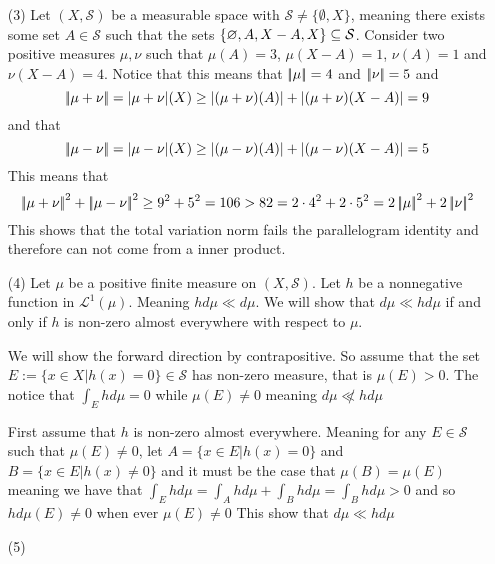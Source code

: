 \documentclass[12pt]{amsart}
\begin{document}
\begin{itemize}
\begin{enumerate}[label=(\alph*)]
    \end{enumerate}
    \item[(3)] Let $(X,\mathcal S)$ be a measurable space with 
    $\mathcal S\neq \{\emptyset, X\}$, meaning there exists some set $A\in \mathcal S$ such 
    that the sets $\{\varnothing, A, X-A, X\}\subseteq \mathcal S$. Consider two positive measures 
    $\mu,\nu$ such that $\mu(A)=3$, $\mu(X-A)=1$,  $\nu(A)=1$ and $\nu(X-A)=4$.
    Notice that this means that $\norm{\mu}=4$ and $\norm{\nu}=5$ and 
    \[\norm{\mu+\nu}=|\mu+\nu|(X)\geq |(\mu+\nu)(A)|+|(\mu+\nu)(X-A)|=9\] 
    and that
    \[\norm{\mu-\nu}=|\mu-\nu|(X)\geq |(\mu-\nu)(A)|+|(\mu-\nu)(X-A)|=5\]
    This means that 
    \[\norm{\mu+\nu}^2+\norm{\mu-\nu}^2\geq 9^2+5^2=106 > 82=2\cdot 4^2+2\cdot 5^2=2\norm{\mu}^2+2\norm{\nu}^2\]
    This shows that the total variation norm fails the parallelogram identity and therefore can not come from a inner product.


    \item[(4)] Let $\mu$ be a positive finite measure on $(X,\mathcal S)$. 
    Let $h$ be a nonnegative function in $\mathcal L^1(\mu)$. Meaning $hd\mu\ll d\mu$.
    We will show that $d\mu\ll hd\mu$ if and only if $h$ is non-zero almost everywhere with respect to $\mu$.
    
    We will show the forward direction by contrapositive. So assume that the set
    $E:=\{x\in X| h(x)=0\}\in\mathcal S$ has non-zero measure, that is $\mu(E)> 0$.
    The notice that $\int_{E}h d\mu=0$ while $\mu(E)\neq 0$ meaning $d\mu\not\ll hd\mu$

    
    First assume that $h$ is non-zero almost everywhere. Meaning for any $E\in\mathcal S$ 
    such that $\mu(E)\neq 0$, let $A=\{x\in E| h(x)=0\}$ and $B=\{x\in E| h(x)\neq 0\}$ 
    and it must be the case that $\mu(B)=\mu(E)$ meaning we
    have that $\int_E h d\mu= \int_A h d\mu+\int_B h d\mu=\int_B h d\mu>0$ and 
    so $h d\mu(E)\neq 0$ when ever $\mu(E)\neq 0$
    This show that $d\mu\ll hd\mu$

    \item[(5)]

\end{itemize}
\end{document}
